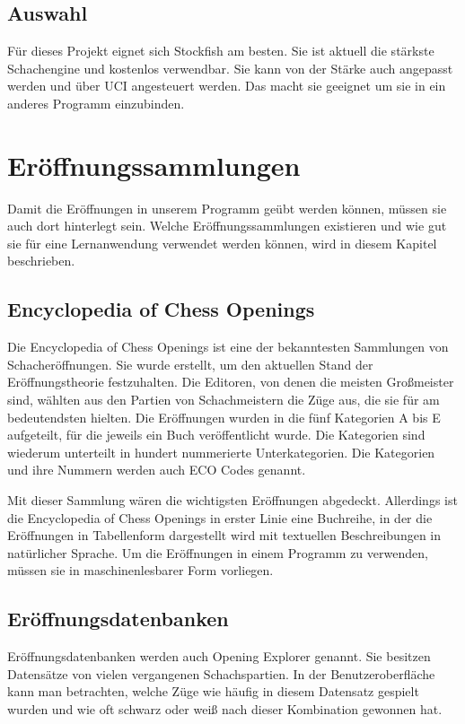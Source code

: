 \subsection{Auswahl}
Für dieses Projekt eignet sich Stockfish am besten. Sie ist aktuell die stärkste Schachengine und kostenlos verwendbar. Sie kann von der Stärke auch angepasst werden und über \ac{UCI} angesteuert werden. Das macht sie geeignet um sie in ein anderes Programm einzubinden.

\section{Eröffnungssammlungen}
Damit die Eröffnungen in unserem Programm geübt werden können, müssen sie auch dort hinterlegt sein. Welche Eröffnungssammlungen existieren und wie gut sie für eine Lernanwendung verwendet werden können, wird in diesem Kapitel beschrieben.

\subsection{Encyclopedia of Chess Openings}
Die Encyclopedia of Chess Openings ist eine der bekanntesten Sammlungen von Schacheröffnungen. Sie wurde erstellt, um den aktuellen Stand der Eröffnungstheorie festzuhalten.
Die Editoren, von denen die meisten Großmeister sind, wählten aus den Partien von Schachmeistern die Züge aus, die sie für am bedeutendsten hielten. Die Eröffnungen wurden in die fünf Kategorien A bis E aufgeteilt, für die jeweils ein Buch veröffentlicht wurde. Die Kategorien sind wiederum unterteilt in hundert nummerierte Unterkategorien. Die Kategorien und ihre Nummern werden auch ECO Codes genannt.
\cite{wikipedia_foundation_inc_encyclopaedia_2024}

Mit dieser Sammlung wären die wichtigsten Eröffnungen abgedeckt. Allerdings ist die Encyclopedia of Chess Openings in erster Linie eine Buchreihe, in der die Eröffnungen in Tabellenform dargestellt wird mit textuellen Beschreibungen in natürlicher Sprache. Um die Eröffnungen in einem Programm zu verwenden, müssen sie in maschinenlesbarer Form vorliegen.

\subsection{Eröffnungsdatenbanken}
Eröffnungsdatenbanken werden auch Opening Explorer genannt. Sie besitzen Datensätze von vielen vergangenen Schachspartien. In der Benutzeroberfläche kann man betrachten, welche Züge wie häufig in diesem Datensatz gespielt wurden und wie oft schwarz oder weiß nach dieser Kombination gewonnen hat. 

